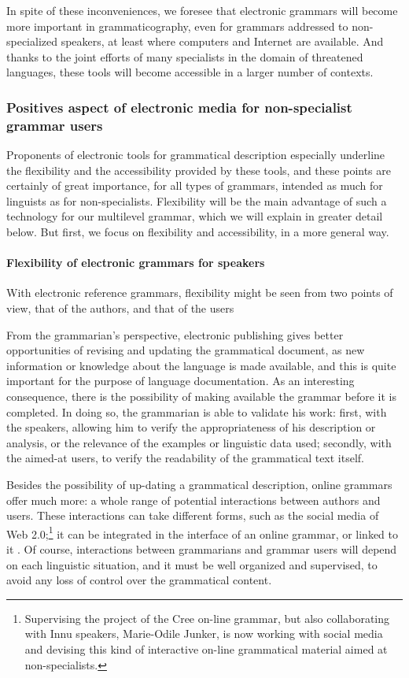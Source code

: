 In spite of these inconveniences, we foresee that electronic grammars will become more important in grammaticography, even for grammars addressed to non-specialized speakers, at least where computers and Internet are available. And thanks to the joint efforts of many specialists in the domain of threatened languages, these tools will become accessible in a larger number of contexts.

\subsubsection{Positives aspect of electronic media for non-specialist grammar users}
Proponents of electronic tools for grammatical description especially underline the flexibility and the accessibility provided by these tools, and these points are certainly of great importance, for all types of grammars, intended as much for linguists as for non-specialists. Flexibility will be the main advantage of such a technology for our multilevel grammar, which we will explain in greater detail below. But first, we focus on flexibility and accessibility, in a more general way.

\paragraph{Flexibility of electronic grammars for speakers}
With electronic reference grammars, flexibility might be seen from two points of view, that of the authors, and that of the users


From the grammarian's perspective, electronic publishing gives better opportunities of revising and updating the grammatical document, as new information or knowledge about the language is made available, and this is quite important for the purpose of language documentation. As an interesting conse\-quence, there is the possibility of making available the grammar before it is completed. In doing so, the grammarian is able to validate his work: first, with the speakers, allowing him to verify the appropriateness of his description or analysis, or the relevance of the examples or linguistic data used; secondly, with the aimed-at users, to verify the readability of the grammatical text itself. 

Besides the possibility of up-dating a grammatical description, online grammars offer much more: a whole range of potential interactions between authors and users. These interactions can take different forms, such as the social media of Web 2.0;\footnote{Supervising
 the project of the Cree on-line grammar, but also collaborating with Innu speakers, Marie-Odile Junker, is now working with social media and devising this kind of interactive on-line grammatical material aimed at non-specialists. 
} 
it can be integrated in the interface of an online grammar, or linked to it \citep{Goodtv,Drudetv}. Of course, interactions between grammarians and grammar users will depend on each linguis\-tic situation, and it must be well organized and supervised, to avoid any loss of control over the grammatical content.

